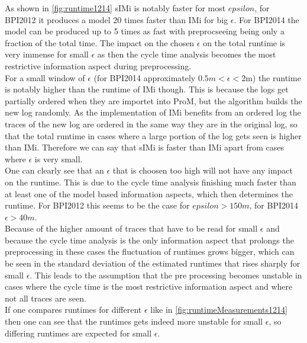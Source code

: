 \documentclass[
	a4paper,
	pagesize,
	pdftex,
	12pt,
	twoside, %
	BCOR=5mm, %
	ngerman,
	fleqn,
	final,
	]{scrartcl}
\begin{document}
As shown in \ref{fig:runtime1214} sIMi is notably faster for most $epsilon$, for BPI2012 it produces a model 20 times faster than IMi for big $\epsilon$. For BPI2014 the model can be produced up to 5 times as fast with preprocseeing being only a fraction of the total time. The impact on the chosen $\epsilon$ on the total runtime is very immense for small $\epsilon$ as then the cycle time analysis becomes the most restrictive information aspect during preprocessing.\\
For a small window of $\epsilon$ (for BPI2014 approximately $0.5m<\epsilon<2$m) the runtime is notably higher than the runtime of IMi though. This is because the logs get partially ordered when they are importet into ProM, but the algorithm builds the new log randomly. As the implementation of IMi benefits from an ordered log the traces of the new log are ordered in the same way they are in the original log, so that the total runtime in cases where a large portion of the log gets seen is higher than IMi. Therefore we can say that sIMi is faster than IMi apart from cases where $\epsilon$ is very small.\\
One can clearly see that an $\epsilon$ that is choosen too high will not have any impact on the runtime. This is due to the cycle time analysis finishing much faster than at least one of the model based information aspects, which then determines the runtime. For BPI2012 this seems to be the case for $epsilon>150m$, for BPI2014 $\epsilon>40m$.\\
Because of the higher amount of traces that have to be read for small $\epsilon$ and because the cycle time analysis is the only information aspect that prolongs the preprocessing in these cases the fluctuation of runtimes grows bigger, which can be seen in the standard deviation of the estimated runtimes that rises sharply for small $\epsilon$. This leads to the assumption that the pre processing becomes unstable in cases where the cycle time is the most restrictive information aspect and where not all traces are seen.\\
If one compares runtimes for different $\epsilon$ like in \ref{fig:runtimeMeasurements1214} then one can see that the runtimes gets indeed more unstable for small $\epsilon$, so differing runtimes are expected for small $\epsilon$.\\
\end{document}
